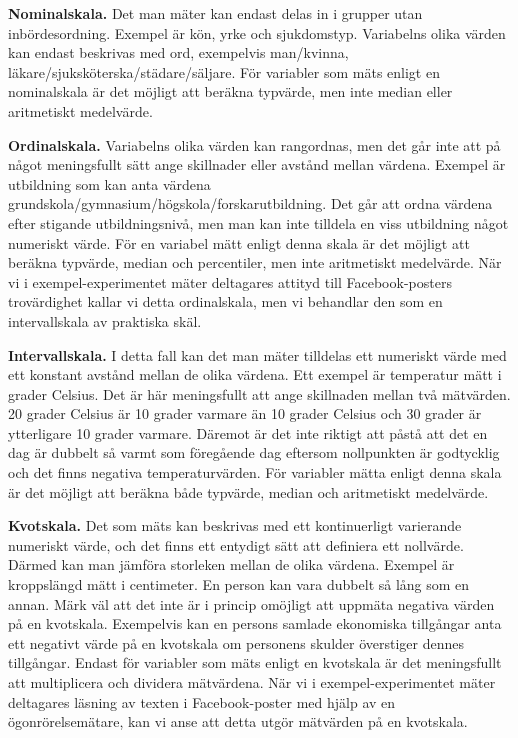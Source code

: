 \documentclass[
]{book}
\begin{document}
\textbf{Nominalskala.} Det man mäter kan endast delas in i grupper utan inbördesordning. Exempel är kön, yrke och sjukdomstyp. Variabelns olika värden kan endast beskrivas med ord, exempelvis man/kvinna, läkare/sjuksköterska/städare/säljare. För variabler som mäts enligt en nominalskala är det möjligt att beräkna typvärde, men inte median eller aritmetiskt medelvärde.

\textbf{Ordinalskala.} Variabelns olika värden kan rangordnas, men det går inte att på något meningsfullt sätt ange skillnader eller avstånd mellan värdena. Exempel är utbildning som kan anta värdena grundskola/gymnasium/högskola/forskarutbildning. Det går att ordna värdena efter stigande utbildningsnivå, men man kan inte tilldela en viss utbildning något numeriskt värde. För en variabel mätt enligt denna skala är det möjligt att beräkna typvärde, median och percentiler, men inte aritmetiskt medelvärde. När vi i exempel-experimentet mäter deltagares attityd till Facebook-posters trovärdighet kallar vi detta ordinalskala, men vi behandlar den som en intervallskala av praktiska skäl.

\textbf{Intervallskala.} I detta fall kan det man mäter tilldelas ett numeriskt värde med ett konstant avstånd mellan de olika värdena. Ett exempel är temperatur mätt i grader Celsius. Det är här meningsfullt att ange skillnaden mellan två mätvärden. 20 grader Celsius är 10 grader varmare än 10 grader Celsius och 30 grader är ytterligare 10 grader varmare. Däremot är det inte riktigt att påstå att det en dag är dubbelt så varmt som föregående dag eftersom nollpunkten är godtycklig och det finns negativa temperaturvärden. För variabler mätta enligt denna skala är det möjligt att beräkna både typvärde, median och aritmetiskt medelvärde.

\textbf{Kvotskala.} Det som mäts kan beskrivas med ett kontinuerligt varierande numeriskt värde, och det finns ett entydigt sätt att definiera ett nollvärde. Därmed kan man jämföra storleken mellan de olika värdena. Exempel är kroppslängd mätt i centimeter. En person kan vara dubbelt så lång som en annan. Märk väl att det inte är i princip omöjligt att uppmäta negativa värden på en kvotskala. Exempelvis kan en persons samlade ekonomiska tillgångar anta ett negativt värde på en kvotskala om personens skulder överstiger dennes tillgångar. Endast för variabler som mäts enligt en kvotskala är det meningsfullt att multiplicera och dividera mätvärdena. När vi i exempel-experimentet mäter deltagares läsning av texten i Facebook-poster med hjälp av en ögonrörelsemätare, kan vi anse att detta utgör mätvärden på en kvotskala.
\end{document}
